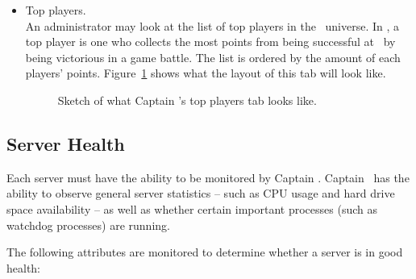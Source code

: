 \begin{itemize}
	\item Top players.\\
	An administrator may look at the list of top players in the \VTank\ universe. In \VTank, a top player is one who collects the most points from being successful at \VTank\ by being victorious in a game battle. The list is ordered by the amount of each players' points. Figure~\ref{fig:captain_vtank_top_players} shows what the layout of this tab will look like.
	\begin{figure}
		\centering
		\caption{Sketch of what Captain \VTank's top players tab looks like.}
		\label{fig:captain_vtank_top_players}
	\end{figure}
\end{itemize}

\subsection{Server Health}

Each server must have the ability to be monitored by Captain \VTank. Captain \VTank\ has the ability to observe general server statistics -- such as CPU usage and hard drive space availability -- as well as whether certain important processes (such as watchdog processes) are running.

The following attributes are monitored to determine whether a server is in good health:

